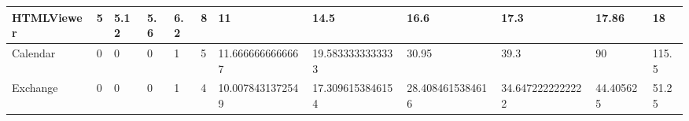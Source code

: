 \newline
\begin{tabular}{|l|l|l|l|l|l|l|l|l|l|l|l|}
\hline
HTMLViewer&5&5.12&5.6&6.2&8&11&14.5&16.6&17.3&17.86&18\\
\hline
Calendar&0&0&0&1&5&11.6666666666667&19.5833333333333&30.95&39.3&90&115.5\\
\hline
Exchange&0&0&0&1&4&10.0078431372549&17.3096153846154&28.4084615384616&34.6472222222222&44.405625&51.25\\
\hline
\end{tabular}
